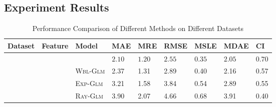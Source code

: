 \subsection{Experiment Results}

\begin{table}[t]
	\scriptsize
	\centering
	\caption{Performance Comparison of Different Methods on Different Datasets}
	\label{table:results}
	\begin{tabu} to \columnwidth {c c l X[r] X[r] X[r] X[r] X[r] X[r]}
		\toprule
		Dataset & Feature &
		Model &  MAE &   MRE &   RMSE &   MSLE &   MDAE &  CI \\
%		
%		
		\midrule
		& 
		& \npglm  &  $\bm{2.10}$ &  $\bm{1.20}$ &   $\bm{2.55}$ &   $\bm{0.35}$ &   $\bm{2.05}$ & $\bm{0.70}$ \\
		& & \textsc{Wbl-Glm} &  2.37 &  1.31 &   2.89 &   0.40 &   2.16 & 0.57 \\
		& & \textsc{Exp-Glm} &  3.21 &  1.58 &   3.84 &   0.54 &   2.89 & 0.55 \\
		& & \textsc{Ray-Glm} &  3.90 &  2.07 &   4.66 &   0.68 &   3.91 & 0.40 \\
		

\end{tabu}
\end{table}
